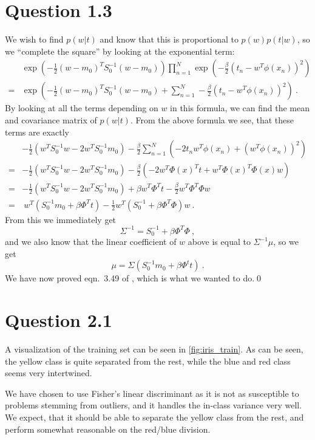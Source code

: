 \documentclass[11pt,a4paper]{article}
\begin{document}
\section{Question 1.3}
We wish to find $p(w|t)$ and know that this is proportional to $p(w)p(t|w)$,
so we ``complete the square'' by looking at the exponential term:
\begin{align*}
    &\exp\left(-\frac{1}{2}(w-m_0)^T S_0^{-1}(w-m_0)\right)
    \prod_{n=1}^N \exp\left(-\frac{\beta}{2}(t_n-w^T\phi(x_n))^2\right)\\
    = &\exp\left(-\frac{1}{2}(w-m_0)^T S_0^{-1}(w-m_0) +
    \sum_{n=1}^N -\frac{\beta}{2}(t_n-w^T\phi(x_n))^2\right)\ .
\end{align*}
By looking at all the terms depending on $w$ in this formula, we can find the
mean and covariance matrix of $p(w|t)$. From the above formula we see, that
these terms are exactly
\begin{align*}
    &-\frac{1}{2}(w^TS_0^{-1}w - 2w^TS_0^{-1}m_0) -\frac{\beta}{2}
    \sum_{n=1}^N \left(-2t_nw^T\phi(x_n) + (w^T\phi(x_n))^2\right)\\
    = &-\frac{1}{2}(w^TS_0^{-1}w - 2w^TS_0^{-1}m_0) -\frac{\beta}{2}\left(
    -2w^T\Phi(x)^T t + w^T\Phi(x)^T\Phi(x)w\right) \\
    = &-\frac{1}{2}(w^TS_0^{-1}w - 2w^TS_0^{-1}m_0)
    +\beta w^T\Phi^T t -\frac{\beta}{2} w^T\Phi^T\Phi w \\
    = &\ w^T(S_0^{-1}m_0 + \beta\Phi^T t) - \frac{1}{2}w^T(S_0^{-1}
    + \beta\Phi^T\Phi)w\ .
\end{align*}
From this we immediately get
\[
    \Sigma^{-1} = S_0^{-1} + \beta\Phi^T\Phi\ ,
\]
and we also know that the linear coefficient of $w$ above is equal to
$\Sigma^{-1}\mu$, so we get
\[
    \mu = \Sigma(S_0^{-1}m_0 + \beta\Phi^t t)\ .
\]
We have now proved eqn.~3.49 of \cite{Bishop}, which is what we wanted to
do.\qed


\section{Question 2.1}
A visualization of the training set can be seen in \autoref{fig:iris_train}.
As can be seen, the yellow class is quite separated from the rest, while the
blue and red class seems very intertwined.

We have chosen to use Fisher's linear discriminant as it is not as susceptible
to problems stemming from outliers, and it handles the in-class variance very
well. We expect, that it should be able to separate the yellow class from the
rest, and perform somewhat reasonable on the red/blue division.
\end{document}
